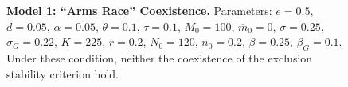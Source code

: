 \documentclass{amsart}
\theoremstyle{definition}
\theoremstyle{remark}
\numberwithin{equation}{section}
\begin{document}
\begin{centering}
\begin{figure}[h]
{		}
		\caption{\footnotesize {\bf Model 1: ``Arms Race'' Coexistence.} Parameters: $e = 0.5$, $d = 0.05$, $\alpha = 0.05$, $\theta = 0.1$, $\tau = 0.1$, $M_0 = 100$, $\overline{m}_0 = 0$, $\sigma = 0.25$, $\sigma_G = 0.22$, $K = 225$, $r = 0.2$, $N_0 = 120$, $\overline{n}_0 = 0.2$, $\beta = 0.25$, $\beta_G = 0.1$.  Under these condition, neither the coexistence of the exclusion stability criterion hold.}
		\label{fig:constant_growth_arms_race_coexistence}
	\end{figure}

	\begin{figure}[h]
\end{figure}
\end{centering}
\end{document}
